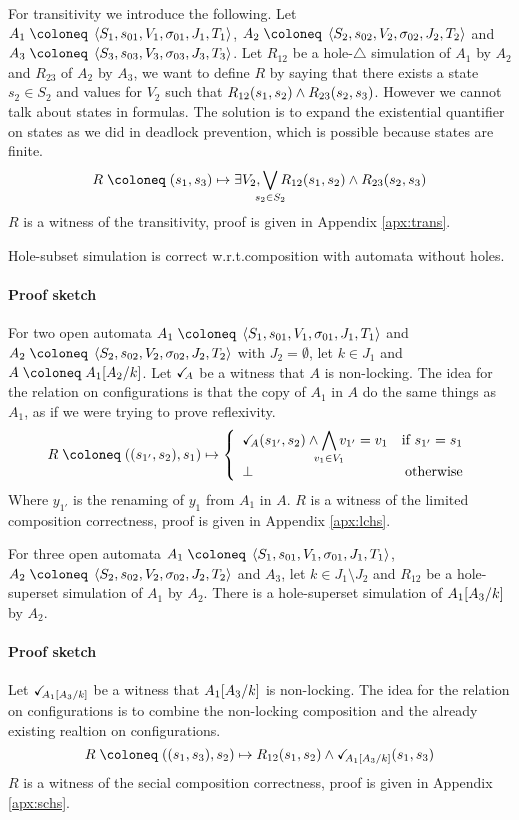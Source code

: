 \documentclass{article}
\begin{document}
For transitivity we introduce the following.
Let \(A_1 \defobject \OAg[1]\), \(A_2 \defobject \OAg[2]\) and \(A_3 \defobject \OAg[3]\).
Let \(R_{12}\) be a hole-\(\triangle\) simulation of \(A_1\) by \(A_2\) and \(R_{23}\) of \(A_2\) by \(A_3\), we want to define \(R\) by saying that there exists a state \(s_2 \in S_2\) and values for \(V_2\) such that \(R_{12}{\left(s_1, s_2\right)} \wedge R_{23}{\left(s_2, s_3\right)}\).
However we cannot talk about states in formulas.
The solution is to expand the existential quantifier on states as we did in deadlock prevention, which is possible because states are finite.
\[ R \defobject \mpar{s_1, s_3} \mapsto \exists V_2, \bigvee_\subbox{s_2 \in S_2} R_{12}\mpar{s_1, s_2} \wedge R_{23}\mpar{s_2, s_3} \]
\(R\) is a witness of the transitivity, proof is given in Appendix \ref{apx:trans}.
\begin{prop}\label{prop:cc'} Hole-subset simulation is correct w.r.t.\@ composition with automata without holes. \end{prop}
\paragraph{Proof sketch}
For two open automata \(A_1 \defobject \OAg[1]\) and \(A_2 \defobject \OAg[2]\) with \(J_2 = \emptyset\), let \(k \in J_1\) and \(A \defobject A_1\subst{A_2}{k}\).
Let \(\checkmark_{\!\! A}\) be a witness that \(A\) is non-locking.
The idea for the relation on configurations is that the copy of \(A_1\) in \(A\) do the same things as \(A_1\), as if we were trying to prove reflexivity.
\[ R \defobject \mpar{\mpar{s_{1'}, s_2}, s_1} \mapsto \choice{\reach{A}\mpar{s_{1'}, s_2} \wedge \bigwedge_\subbox{v_1 \in V_1} v_{1'} = v_1 & \text{if } s_{1'} = s_1 \\ \bot & \text{otherwise}} \]
Where \(y_{1'}\) is the renaming of \(y_1\) from \(A_1\) in \(A\).
\(R\) is a witness of the limited composition correctness, proof is given in Appendix \ref{apx:lchs}.
\begin{prop}
For three open automata \(A_1 \defobject \OAg[1]\), \(A_2 \defobject \OAg[2]\) and \(A_3\), let \(k \in J_1 \setminus J_2\) and \(R_{12}\) be a hole-superset simulation of \(A_1\) by \(A_2\).
There is a hole-superset simulation of \(A_1{\left[A_3\middle/k\right]}\) by \(A_2\).
\end{prop}
\paragraph{Proof sketch}
Let \(\checkmark_{\!\! A_1{\left[A_3\middle/k\right]}}\) be a witness that \(A_1{\left[A_3\middle/k\right]}\) is non-locking.
The idea for the relation on configurations is to combine the non-locking composition and the already existing realtion on configurations.
\[ R \defobject \mpar{\mpar{s_1, s_3}, s_2} \mapsto R_{12}\mpar{s_1, s_2} \wedge \reach{A_1\subst{A_3}{k}}\mpar{s_1, s_3} \]
\(R\) is a witness of the secial composition correctness, proof is given in Appendix \ref{apx:schs}.
\end{document}
